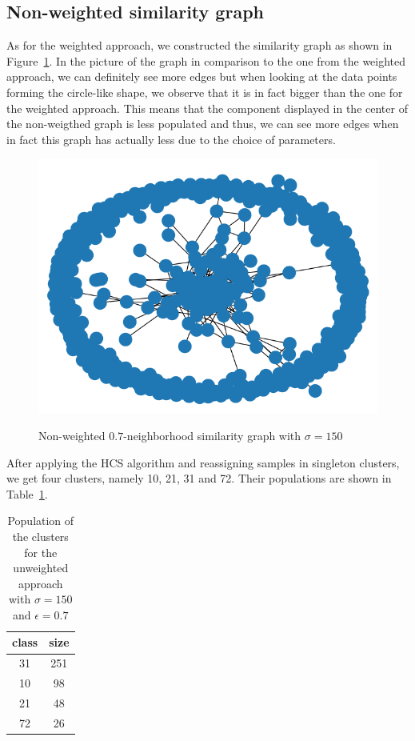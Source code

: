 \documentclass[paper=a4,fontsize=11pt,DIV=8,BCOR=5mm,twoside,pdftex,bibtotocnumbered]{scrreprt}
\theoremstyle{plain}
\begin{document}
\subsection{Non-weighted similarity graph}
As for the weighted approach, we constructed the similarity graph as shown in Figure~\ref{fig:unweighted_sim_graph}. In the picture of the graph in comparison to the one from the weighted approach, we can definitely see more edges but when looking at the data points forming the circle-like shape, we observe that it is in fact bigger than the one for the weighted approach. This means that the component displayed in the center of the non-weigthed graph is less populated and thus, we can see more edges when in fact this graph has actually less due to the choice of parameters.

\begin{figure}
	\centering
	\caption{Non-weighted $0.7$-neighborhood similarity graph with $\sigma=150$}
	\includegraphics[scale=0.5]{G_unweighted.png}
	\label{fig:unweighted_sim_graph}
\end{figure}

After applying the HCS algorithm and reassigning samples in singleton clusters, we get four clusters, namely 10, 21, 31 and 72. Their populations are shown in Table~\ref{tab:pop_clusters_unweighted}.

\begin{table}
	\caption{Population of the clusters for the unweighted approach with $\sigma=150$ and  $\epsilon=0.7$}
	\centering
	\begin{tabular}{|c|c|}
		\hline
		class & size \\
		\hline
		31 & 251 \\
		10 & 98 \\
		21 & 48 \\
		72 & 26 \\
		\hline
	\end{tabular}
	\label{tab:pop_clusters_unweighted}
\end{table}
\end{document}
